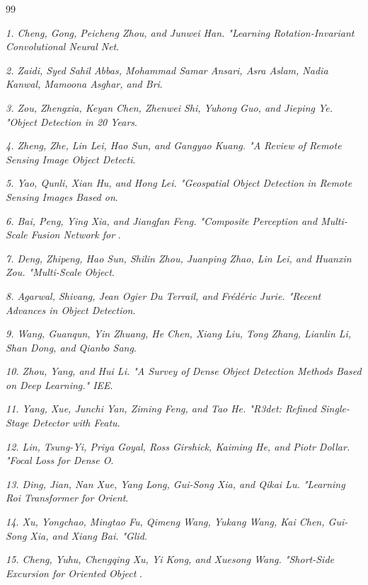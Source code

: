 \documentclass[journal]{IEEEtran}
\begin{document}
\begin{thebibliography}{99}

\textit{1.	Cheng, Gong, Peicheng Zhou, and Junwei Han. "Learning Rotation-Invariant Convolutional Neural Net}.

\textit{2.	Zaidi, Syed Sahil Abbas, Mohammad Samar Ansari, Asra Aslam, Nadia Kanwal, Mamoona Asghar, and Bri}.

\textit{3.	Zou, Zhengxia, Keyan Chen, Zhenwei Shi, Yuhong Guo, and Jieping Ye. "Object Detection in 20 Years}.

\textit{4.	Zheng, Zhe, Lin Lei, Hao Sun, and Gangyao Kuang. "A Review of Remote Sensing Image Object Detecti}.

\textit{5.	Yao, Qunli, Xian Hu, and Hong Lei. "Geospatial Object Detection in Remote Sensing Images Based on}.

\textit{6.	Bai, Peng, Ying Xia, and Jiangfan Feng. "Composite Perception and Multi-Scale Fusion Network for }.

\textit{7.	Deng, Zhipeng, Hao Sun, Shilin Zhou, Juanping Zhao, Lin Lei, and Huanxin Zou. "Multi-Scale Object}.

\textit{8.	Agarwal, Shivang, Jean Ogier Du Terrail, and Frédéric Jurie. "Recent Advances in Object Detection}.

\textit{9.	Wang, Guanqun, Yin Zhuang, He Chen, Xiang Liu, Tong Zhang, Lianlin Li, Shan Dong, and Qianbo Sang}.

\textit{10.	Zhou, Yang, and Hui Li. "A Survey of Dense Object Detection Methods Based on Deep Learning." IEE}.

\textit{11.	Yang, Xue, Junchi Yan, Ziming Feng, and Tao He. "R3det: Refined Single-Stage Detector with Featu}.

\textit{12.	Lin, Tsung-Yi, Priya Goyal, Ross Girshick, Kaiming He, and Piotr Dollar. "Focal Loss for Dense O}.

\textit{13.	Ding, Jian, Nan Xue, Yang Long, Gui-Song Xia, and Qikai Lu. "Learning Roi Transformer for Orient}.

\textit{14.	Xu, Yongchao, Mingtao Fu, Qimeng Wang, Yukang Wang, Kai Chen, Gui-Song Xia, and Xiang Bai. "Glid}.

\textit{15.	Cheng, Yuhu, Chengqing Xu, Yi Kong, and Xuesong Wang. "Short-Side Excursion for Oriented Object }.


\end{thebibliography}
\end{document}
